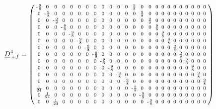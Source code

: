 \documentclass[pdftex,a4paper,parskip,listof=totoc,bibliography=totoc,onehalfspacing,12pt]{scrreprt}
\begin{document}
\begin{align*}
	\underline{D}_{\,z,f}^4 &= \begin{psmallmatrix}
\text{-}\frac{9}{8} & 0 & 0 & 0 & 0 & 0 & 0 & 0 & 0 & 0 & 0 & 0 & \frac{9}{8} & 0 & 0 & 0 & 0 & 0 & 0 & 0 & 0 & 0 & 0 & 0 \\
0 & \text{-}\frac{9}{8} & 0 & 0 & 0 & 0 & 0 & 0 & 0 & 0 & 0 & 0 & 0 & \frac{9}{8} & 0 & 0 & 0 & 0 & 0 & 0 & 0 & 0 & 0 & 0 \\
0 & 0 & \text{-}\frac{9}{8} & 0 & 0 & 0 & 0 & 0 & 0 & 0 & 0 & 0 & 0 & 0 & \frac{9}{8} & 0 & 0 & 0 & 0 & 0 & 0 & 0 & 0 & 0 \\
0 & 0 & 0 & \text{-}\frac{9}{8} & 0 & 0 & 0 & 0 & 0 & 0 & 0 & 0 & 0 & 0 & 0 & \frac{9}{8} & 0 & 0 & 0 & 0 & 0 & 0 & 0 & 0 \\
0 & 0 & 0 & 0 & \text{-}\frac{9}{8} & 0 & 0 & 0 & 0 & 0 & 0 & 0 & 0 & 0 & 0 & 0 & \frac{9}{8} & 0 & 0 & 0 & 0 & 0 & 0 & 0 \\
0 & 0 & 0 & 0 & 0 & \text{-}\frac{9}{8} & 0 & 0 & 0 & 0 & 0 & 0 & 0 & 0 & 0 & 0 & 0 & \frac{9}{8} & 0 & 0 & 0 & 0 & 0 & 0 \\
0 & 0 & 0 & 0 & 0 & 0 & \text{-}\frac{9}{8} & 0 & 0 & 0 & 0 & 0 & 0 & 0 & 0 & 0 & 0 & 0 & \frac{9}{8} & 0 & 0 & 0 & 0 & 0 \\
0 & 0 & 0 & 0 & 0 & 0 & 0 & \text{-}\frac{9}{8} & 0 & 0 & 0 & 0 & 0 & 0 & 0 & 0 & 0 & 0 & 0 & \frac{9}{8} & 0 & 0 & 0 & 0 \\
0 & 0 & 0 & 0 & 0 & 0 & 0 & 0 & \text{-}\frac{9}{8} & 0 & 0 & 0 & 0 & 0 & 0 & 0 & 0 & 0 & 0 & 0 & \frac{9}{8} & 0 & 0 & 0 \\
0 & 0 & 0 & 0 & 0 & 0 & 0 & 0 & 0 & \text{-}\frac{9}{8} & 0 & 0 & 0 & 0 & 0 & 0 & 0 & 0 & 0 & 0 & 0 & \frac{9}{8} & 0 & 0 \\
0 & 0 & 0 & 0 & 0 & 0 & 0 & 0 & 0 & 0 & \text{-}\frac{9}{8} & 0 & 0 & 0 & 0 & 0 & 0 & 0 & 0 & 0 & 0 & 0 & \frac{9}{8} & 0 \\
0 & 0 & 0 & 0 & 0 & 0 & 0 & 0 & 0 & 0 & 0 & \text{-}\frac{9}{8} & 0 & 0 & 0 & 0 & 0 & 0 & 0 & 0 & 0 & 0 & 0 & \frac{9}{8} \\
\frac{1}{24} & 0 & 0 & 0 & 0 & 0 & 0 & 0 & 0 & 0 & 0 & 0 & \text{-}\frac{9}{8} & 0 & 0 & 0 & 0 & 0 & 0 & 0 & 0 & 0 & 0 & 0 \\
0 & \frac{1}{24} & 0 & 0 & 0 & 0 & 0 & 0 & 0 & 0 & 0 & 0 & 0 & \text{-}\frac{9}{8} & 0 & 0 & 0 & 0 & 0 & 0 & 0 & 0 & 0 & 0 \\
0 & 0 & \frac{1}{24} & 0 & 0 & 0 & 0 & 0 & 0 & 0 & 0 & 0 & 0 & 0 & \text{-}\frac{9}{8} & 0 & 0 & 0 & 0 & 0 & 0 & 0 & 0 & 0 \\

\end{psmallmatrix}
\end{align*}
\end{document}
